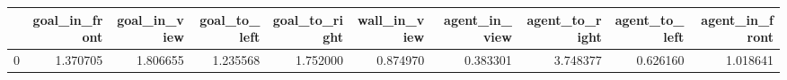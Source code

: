 \begin{tabular}{lrrrrrrrrr}
\toprule
 & goal\_in\_front & goal\_in\_view & goal\_to\_left & goal\_to\_right & wall\_in\_view & agent\_in\_view & agent\_to\_right & agent\_to\_left & agent\_in\_front \\
\midrule
0 & 1.370705 & 1.806655 & 1.235568 & 1.752000 & 0.874970 & 0.383301 & 3.748377 & 0.626160 & 1.018641 \\
\bottomrule
\end{tabular}
